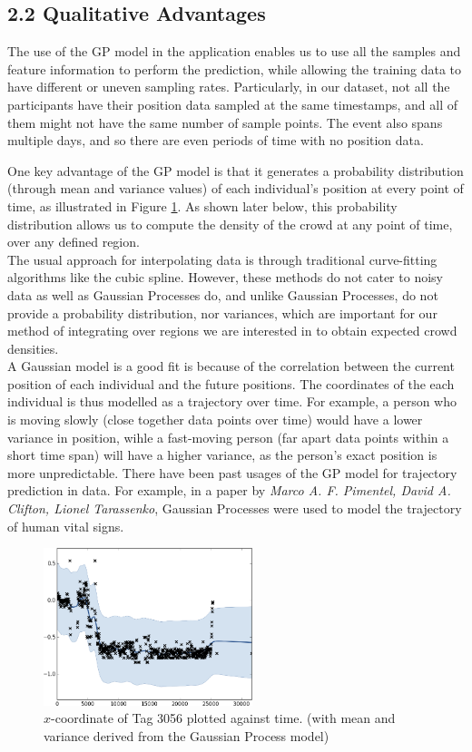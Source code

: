 \documentclass[letterpaper]{article}
\begin{document}
\subsection{2.2  Qualitative Advantages}

The use of the GP model in the application enables us to use all the samples and feature information to perform the prediction, while allowing the training data to have different or uneven sampling rates. Particularly, in our dataset, not all the participants have their position data sampled at the same timestamps, and all of them might not have the same number of sample points. The event also spans multiple days, and so there are even periods of time with no position data.

One key advantage of the GP model is that it generates a probability distribution (through mean and variance values) of each individual's position at every point of time, as illustrated in Figure \ref{fig:GP1}. As shown later below, this probability distribution allows us to compute the density of the crowd at any point of time, over any defined region. \\

The usual approach for interpolating data is through traditional curve-fitting algorithms like the cubic spline. However, these methods do not cater to noisy data as well as Gaussian Processes do, and unlike Gaussian Processes, do not provide a probability distribution, nor variances, which are important for our method of integrating over regions we are interested in to obtain expected crowd densities.\\

A Gaussian model is a good fit is because of the correlation between the current position of each individual and the future positions. The coordinates of the each individual is thus modelled as a trajectory over time. For example, a person who is moving slowly (close together data points over time) would have a lower variance in position, wihle a fast-moving person (far apart data points within a short time span) will have a higher variance, as the person's exact position is more unpredictable. There have been past usages of the GP model for trajectory prediction in data. For example, in a paper by {\it Marco A. F. Pimentel, David A. Clifton, Lionel Tarassenko}, Gaussian Processes were used to model the trajectory of human vital signs.

\begin{figure}[!h]
  \centering
    \includegraphics[width=230px,natwidth=665,natheight=391]{selected_GP/3056.csv_X.png}
  \caption{$x$-coordinate of Tag 3056 plotted against time. (with mean and variance derived from the Gaussian Process model)}
  \label{fig:GP1}
\end{figure}
\end{document}
